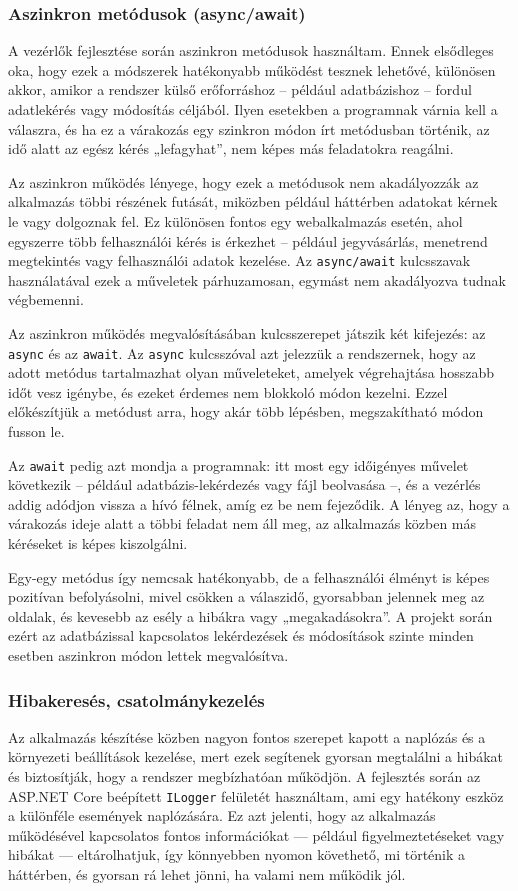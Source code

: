 \subsubsection{Aszinkron metódusok (async/await)}
A vezérlők fejlesztése során aszinkron metódusok használtam. Ennek elsődleges oka, hogy ezek a módszerek hatékonyabb működést tesznek lehetővé, különösen akkor, amikor a rendszer külső erőforráshoz – például adatbázishoz – fordul adatlekérés vagy módosítás céljából. Ilyen esetekben a programnak várnia kell a válaszra, és ha ez a várakozás egy szinkron módon írt metódusban történik, az idő alatt az egész kérés „lefagyhat”, nem képes más feladatokra reagálni.

Az aszinkron működés lényege, hogy ezek a metódusok nem akadályozzák az alkalmazás többi részének futását, miközben például háttérben adatokat kérnek le vagy dolgoznak fel. Ez különösen fontos egy webalkalmazás esetén, ahol egyszerre több felhasználói kérés is érkezhet – például jegyvásárlás, menetrend megtekintés vagy felhasználói adatok kezelése. Az \texttt{async/await} kulcsszavak használatával ezek a műveletek párhuzamosan, egymást nem akadályozva tudnak végbemenni.

Az aszinkron működés megvalósításában kulcsszerepet játszik két kifejezés: az \texttt{async} és az \texttt{await}. Az \texttt{async} kulcsszóval azt jelezzük a rendszernek, hogy az adott metódus tartalmazhat olyan műveleteket, amelyek végrehajtása hosszabb időt vesz igénybe, és ezeket érdemes nem blokkoló módon kezelni. Ezzel előkészítjük a metódust arra, hogy akár több lépésben, megszakítható módon fusson le.

Az \texttt{await} pedig azt mondja a programnak: itt most egy időigényes művelet következik – például adatbázis-lekérdezés vagy fájl beolvasása –, és a vezérlés addig adódjon vissza a hívó félnek, amíg ez be nem fejeződik. A lényeg az, hogy a várakozás ideje alatt a többi feladat nem áll meg, az alkalmazás közben más kéréseket is képes kiszolgálni.

Egy-egy metódus így nemcsak hatékonyabb, de a felhasználói élményt is képes pozitívan befolyásolni, mivel csökken a válaszidő, gyorsabban jelennek meg az oldalak, és kevesebb az esély a hibákra vagy „megakadásokra”. A projekt során ezért az adatbázissal kapcsolatos lekérdezések és módosítások szinte minden esetben aszinkron módon lettek megvalósítva.

\subsubsection{Hibakeresés, csatolmánykezelés}
Az alkalmazás készítése közben nagyon fontos szerepet kapott a naplózás és a környezeti beállítások kezelése, mert ezek segítenek gyorsan megtalálni a hibákat és biztosítják, hogy a rendszer megbízhatóan működjön. A fejlesztés során az ASP.NET Core beépített \texttt{ILogger} felületét használtam, ami egy hatékony eszköz a különféle események naplózására. Ez azt jelenti, hogy az alkalmazás működésével kapcsolatos fontos információkat — például figyelmeztetéseket vagy hibákat — eltárolhatjuk, így könnyebben nyomon követhető, mi történik a háttérben, és gyorsan rá lehet jönni, ha valami nem működik jól.

